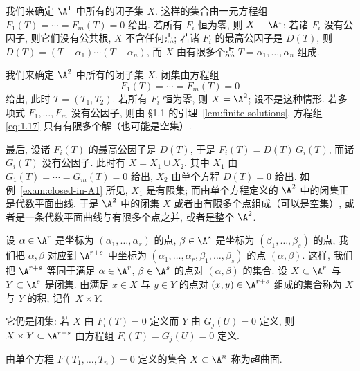 \begin{example}\label{exam:closed-in-A1}
	我们来确定 $\A^1$ 中所有的闭子集 $X$. 这样的集合由一元方程组 $F_1(T) = \cdots = F_m(T) = 0$ 给出. 若所有 $F_i$ 恒为零, 则 $X = \A^1$; 若诸 $F_i$ 没有公因子, 则它们没有公共根, $X$ 不含任何点; 若诸 $F_i$ 的最高公因子是 $D(T)$, 则 $D(T) = (T - \alpha_1) \cdots (T - \alpha_n)$, 而 $X$ 由有限多个点 $T = \alpha_1, \ldots, \alpha_n$ 组成.
\end{example}

\begin{example}\label{exam:closed-in-A2}
	我们来确定 $\A^2$ 中所有的闭子集 $X$. 闭集由方程组
	\begin{equation}
		\label{eq:1.17}
		F_1(T) = \cdots = F_m(T) = 0
	\end{equation}
	给出, 此时 $T = (T_1, T_2)$. 若所有 $F_i$ 恒为零, 则 $X = \A^2$; 设不是这种情形. 若多项式 $F_1, \ldots, F_m$ 没有公因子, 则由 §1.1 的引理~\ref{lem:finite-solutions}, 方程组 \eqref{eq:1.17} 只有有限多个解（也可能是空集）.

	最后, 设诸 $F_i(T)$ 的最高公因子是 $D(T)$, 于是 $F_i(T) = D(T)\, G_i(T)$, 而诸 $G_i(T)$ 没有公因子. 此时有 $X = X_1 \cup X_2$, 其中 $X_1$ 由 $G_1(T) = \cdots = G_m(T) = 0$ 给出, $X_2$ 由单个方程 $D(T) = 0$ 给出. 如例~\ref{exam:closed-in-A1} 所见, $X_1$ 是有限集; 而由单个方程定义的 $\A^2$ 中的闭集正是代数平面曲线. 于是 $\A^2$ 中的闭集 $X$ 或者由有限多个点组成（可以是空集）, 或者是一条代数平面曲线与有限多个点之并, 或者是整个 $\A^2$.
\end{example}

\begin{example}\label{exam:product-closed}
	设 $\alpha \in \A^r$ 是坐标为 $(\alpha_1, \ldots, \alpha_r)$ 的点, $\beta \in \A^s$ 是坐标为 $(\beta_1, \ldots, \beta_s)$ 的点, 我们把 $\alpha, \beta$ 对应到 $\A^{r+s}$ 中坐标为 $(\alpha_1, \ldots, \alpha_r, \beta_1, \ldots, \beta_s)$ 的点 $(\alpha, \beta)$. 这样, 我们把 $\A^{r+s}$ 等同于满足 $\alpha \in \A^r$, $\beta \in \A^s$ 的点对 $(\alpha, \beta)$ 的集合. 设 $X \subset \A^r$ 与 $Y \subset \A^s$ 是闭集. 由满足 $x \in X$ 与 $y \in Y$ 的点对 $(x, y) \in \A^{r+s}$ 组成的集合称为 $X$ 与 $Y$ 的积, 记作 $X \times Y$.

	它仍是闭集: 若 $X$ 由 $F_i(T) = 0$ 定义而 $Y$ 由 $G_j(U) = 0$ 定义, 则 $X \times Y \subset \A^{r+s}$ 由方程组 $F_i(T) = G_j(U) = 0$ 定义.
\end{example}

\begin{example}\label{exam:hypersurface}
	由单个方程 $F(T_1, \ldots, T_n) = 0$ 定义的集合 $X \subset \A^n$ 称为超曲面.
\end{example}

